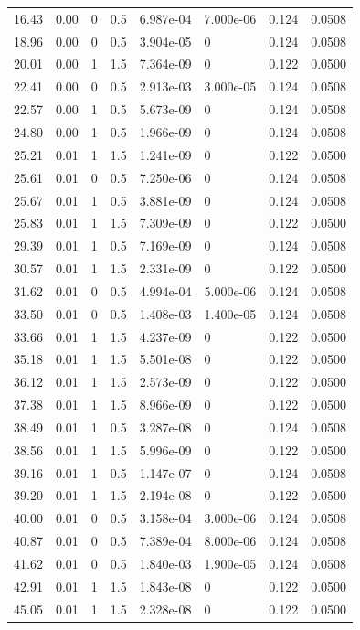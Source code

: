 \documentclass[preview]{standalone}
\begin{document}
{{\begin{tabular}{L{1.2cm}C{1.2cm} C{0.3cm}C{0.5cm} C{1.4cm}C{1.4cm} C{1.4cm}C{1.4cm}}
  16.43  &  0.00  & 0     & 0.5 &  6.987e-04  & 7.000e-06  & 0.124 &  0.0508   \\ 
  18.96  &  0.00  & 0     & 0.5 &  3.904e-05  & 0  & 0.124 &  0.0508   \\ 
  20.01  &  0.00  & 1     & 1.5 &  7.364e-09  & 0  & 0.122 &  0.0500   \\ 
  22.41  &  0.00  & 0     & 0.5 &  2.913e-03  & 3.000e-05  & 0.124 &  0.0508   \\ 
  22.57  &  0.00  & 1     & 0.5 &  5.673e-09  & 0  & 0.124 &  0.0508   \\ 
  24.80  &  0.00  & 1     & 0.5 &  1.966e-09  & 0  & 0.124 &  0.0508   \\ 
  25.21  &  0.01  & 1     & 1.5 &  1.241e-09  & 0  & 0.122 &  0.0500   \\ 
  25.61  &  0.01  & 0     & 0.5 &  7.250e-06  & 0  & 0.124 &  0.0508   \\ 
  25.67  &  0.01  & 1     & 0.5 &  3.881e-09  & 0  & 0.124 &  0.0508   \\ 
  25.83  &  0.01  & 1     & 1.5 &  7.309e-09  & 0  & 0.122 &  0.0500   \\ 
  29.39  &  0.01  & 1     & 0.5 &  7.169e-09  & 0  & 0.124 &  0.0508   \\ 
  30.57  &  0.01  & 1     & 1.5 &  2.331e-09  & 0  & 0.122 &  0.0500   \\ 
  31.62  &  0.01  & 0     & 0.5 &  4.994e-04  & 5.000e-06  & 0.124 &  0.0508   \\ 
  33.50  &  0.01  & 0     & 0.5 &  1.408e-03  & 1.400e-05  & 0.124 &  0.0508   \\ 
  33.66  &  0.01  & 1     & 1.5 &  4.237e-09  & 0  & 0.122 &  0.0500   \\ 
  35.18  &  0.01  & 1     & 1.5 &  5.501e-08  & 0  & 0.122 &  0.0500   \\ 
  36.12  &  0.01  & 1     & 1.5 &  2.573e-09  & 0  & 0.122 &  0.0500   \\ 
  37.38  &  0.01  & 1     & 1.5 &  8.966e-09  & 0  & 0.122 &  0.0500   \\ 
  38.49  &  0.01  & 1     & 0.5 &  3.287e-08  & 0  & 0.124 &  0.0508   \\ 
  38.56  &  0.01  & 1     & 1.5 &  5.996e-09  & 0  & 0.122 &  0.0500   \\ 
  39.16  &  0.01  & 1     & 0.5 &  1.147e-07  & 0  & 0.124 &  0.0508   \\ 
  39.20  &  0.01  & 1     & 1.5 &  2.194e-08  & 0  & 0.122 &  0.0500   \\ 
  40.00  &  0.01  & 0     & 0.5 &  3.158e-04  & 3.000e-06  & 0.124 &  0.0508   \\ 
  40.87  &  0.01  & 0     & 0.5 &  7.389e-04  & 8.000e-06  & 0.124 &  0.0508   \\ 
  41.62  &  0.01  & 0     & 0.5 &  1.840e-03  & 1.900e-05  & 0.124 &  0.0508   \\ 
  42.91  &  0.01  & 1     & 1.5 &  1.843e-08  & 0  & 0.122 &  0.0500   \\ 
  45.05  &  0.01  & 1     & 1.5 &  2.328e-08  & 0  & 0.122 &  0.0500   \\ 
\hline 
\end{tabular} 

}}
\end{document}
